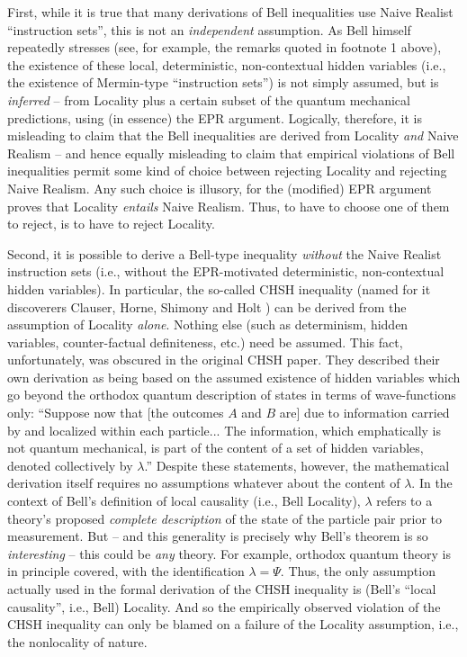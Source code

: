 \documentclass[12pt]{article}
\begin{document}
First, while it is true that many derivations of Bell inequalities use
Naive Realist ``instruction sets'', this is not an \emph{independent}
assumption.  As Bell himself repeatedly stresses (see, for example,
the remarks quoted in footnote 1 above), the existence of
these local, deterministic, non-contextual hidden variables (i.e., the
existence of Mermin-type ``instruction sets'') is not simply assumed,
but is \emph{inferred} -- from Locality plus a certain subset of the
quantum mechanical predictions, using (in essence) the EPR argument. 
\cite{nonlocchar}  Logically, therefore, it is misleading
to claim that the Bell inequalities are derived from 
Locality \emph{and} Naive Realism -- and hence equally misleading
to claim that empirical violations of Bell inequalities
permit some kind of choice between rejecting Locality and rejecting
Naive Realism.  Any such choice is illusory, for the (modified) EPR
argument proves that Locality \emph{entails} Naive Realism.  Thus, to 
have to choose one of them to reject, is to have to reject Locality.

Second, it is possible to derive a Bell-type inequality \emph{without}
the Naive Realist instruction sets (i.e., without the EPR-motivated 
deterministic, non-contextual hidden variables).  In particular, the
so-called CHSH inequality (named for it discoverers Clauser, Horne, 
Shimony and Holt \cite{chsh}) can be derived from the assumption of Locality
\emph{alone}.  Nothing else (such as determinism, hidden variables,
counter-factual definiteness, etc.) need be assumed. \cite{cfm} 
This fact,
unfortunately, was obscured in the original CHSH paper.  They
described their own derivation as being based on the 
assumed existence of hidden variables which go beyond the orthodox
quantum description of states in terms of wave-functions only:
``Suppose now that [the outcomes $A$ and $B$ are] 
due to information carried by and localized within each
particle... The information, which emphatically is not quantum
mechanical, is part of the content of a set of hidden variables, denoted
collectively by $\lambda$.''  Despite these statements, however, the
mathematical derivation itself requires no assumptions whatever about
the content of $\lambda$.  In the context of Bell's definition of
local causality (i.e., Bell Locality), $\lambda$ refers to a theory's
proposed \emph{complete description} of the state of the particle pair
prior to measurement.  But -- and this generality is precisely why
Bell's theorem is so \emph{interesting} -- this could be \emph{any}
theory.  For example, orthodox quantum theory is in principle covered,
with the identification $\lambda = \Psi$.  Thus, the only assumption
actually used in the formal derivation of the CHSH inequality is
(Bell's ``local causality'', i.e., Bell) Locality.  And so the
empirically observed violation of the CHSH inequality can only be
blamed on a failure of the Locality assumption, i.e., the nonlocality
of nature.  
\end{document}
